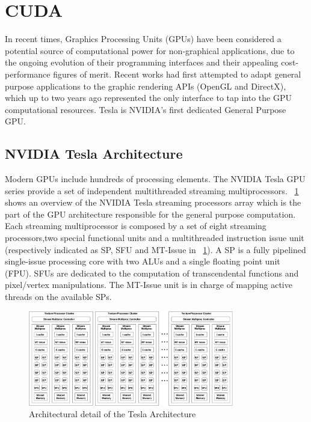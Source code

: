 \section{CUDA}
\label{sec:art_of_cuda}
   In recent times, Graphics Processing Units (GPUs) have been considered a potential source of computational
power for non-graphical applications, due to the ongoing evolution of their programming interfaces and their
appealing cost-performance figures of merit. Recent works had first attempted to adapt general purpose applications
to the graphic rendering APIs (OpenGL and DirectX), which up to two years ago represented the only interface to tap
into the GPU computational resources. Tesla is NVIDIA's first dedicated General Purpose GPU.
\newline
\subsection{NVIDIA Tesla Architecture}
   Modern GPUs include hundreds of processing elements. The NVIDIA Tesla GPU series provide a set
of independent multithreaded streaming multiprocessors. \figurename~\ref{fig:teslaarch} shows an overview of the NVIDIA
Tesla streaming processors array which is the part of the GPU architecture responsible for the general purpose computation.
Each streaming multiprocessor is composed by a set of eight streaming processors,two special functional units and a multithreaded
instruction issue unit (respectively indicated as SP, SFU and MT-Issue in \figurename~\ref{fig:teslaarch}).\newline
A SP is a fully pipelined single-issue processing core with two ALUs and a single floating point unit (FPU). 
SFUs are dedicated to the computation of transcendental functions and pixel/vertex manipulations.
The MT-Issue unit is in charge of mapping active threads on the available SPs.\newline

\begin{figure}[h!tp]
    \centering
     \includegraphics[width=0.8\textwidth]{./img/nvidiadetail}
\caption{Architectural detail of the Tesla Architecture}\label{fig:teslaarch}
    \end{figure}

